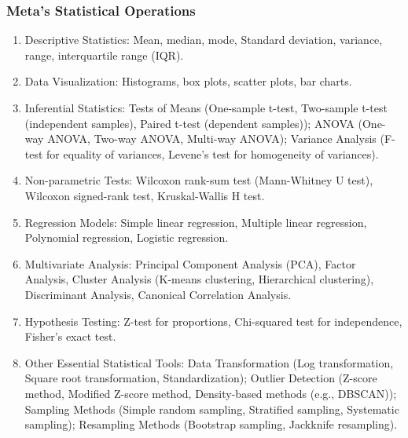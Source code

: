 \documentclass{article}
\begin{document}
\subsubsection{Meta's Statistical Operations}
\begin{enumerate}
    \item Descriptive Statistics: Mean, median, mode, Standard deviation, variance, range, interquartile range (IQR).
    \item Data Visualization: Histograms, box plots, scatter plots, bar charts.
    \item Inferential Statistics: Tests of Means (One-sample t-test, Two-sample t-test (independent samples), Paired t-test (dependent samples)); ANOVA (One-way ANOVA, Two-way ANOVA, Multi-way ANOVA); Variance Analysis (F-test for equality of variances, Levene's test for homogeneity of variances).
    \item Non-parametric Tests: Wilcoxon rank-sum test (Mann-Whitney U test), Wilcoxon signed-rank test, Kruskal-Wallis H test.
    \item Regression Models: Simple linear regression, Multiple linear regression, Polynomial regression, Logistic regression.
    \item Multivariate Analysis: Principal Component Analysis (PCA), Factor Analysis, Cluster Analysis (K-means clustering, Hierarchical clustering), Discriminant Analysis, Canonical Correlation Analysis.
    \item Hypothesis Testing: Z-test for proportions, Chi-squared test for independence, Fisher's exact test.
    \item Other Essential Statistical Tools: Data Transformation (Log transformation, Square root transformation, Standardization); Outlier Detection (Z-score method, Modified Z-score method, Density-based methods (e.g., DBSCAN)); Sampling Methods (Simple random sampling, Stratified sampling, Systematic sampling); Resampling Methods (Bootstrap sampling, Jackknife resampling).
\end{enumerate}
\end{document}
